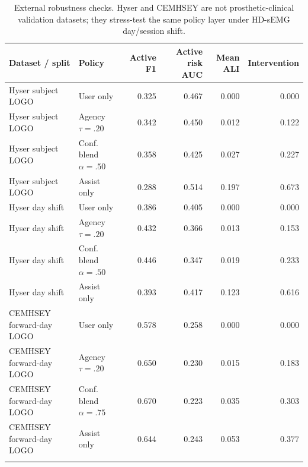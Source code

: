 \begin{table}[!t]
\centering
\caption{External robustness checks. Hyser and CEMHSEY are not prosthetic-clinical validation datasets; they stress-test the same policy layer under HD-sEMG day/session shift.}
\label{tab:external}
\footnotesize
\begin{tabular}{llrrrr}
\toprule
Dataset / split & Policy & Active F1 & Active risk AUC & Mean ALI & Intervention \\
\midrule
Hyser subject LOGO & User only & 0.325 & 0.467 & 0.000 & 0.000 \\
Hyser subject LOGO & Agency $\tau=.20$ & 0.342 & 0.450 & 0.012 & 0.122 \\
Hyser subject LOGO & Conf. blend $\alpha=.50$ & 0.358 & 0.425 & 0.027 & 0.227 \\
Hyser subject LOGO & Assist only & 0.288 & 0.514 & 0.197 & 0.673 \\
\addlinespace
Hyser day shift & User only & 0.386 & 0.405 & 0.000 & 0.000 \\
Hyser day shift & Agency $\tau=.20$ & 0.432 & 0.366 & 0.013 & 0.153 \\
Hyser day shift & Conf. blend $\alpha=.50$ & 0.446 & 0.347 & 0.019 & 0.233 \\
Hyser day shift & Assist only & 0.393 & 0.417 & 0.123 & 0.616 \\
\addlinespace
CEMHSEY forward-day LOGO & User only & 0.578 & 0.258 & 0.000 & 0.000 \\
CEMHSEY forward-day LOGO & Agency $\tau=.20$ & 0.650 & 0.230 & 0.015 & 0.183 \\
CEMHSEY forward-day LOGO & Conf. blend $\alpha=.75$ & 0.670 & 0.223 & 0.035 & 0.303 \\
CEMHSEY forward-day LOGO & Assist only & 0.644 & 0.243 & 0.053 & 0.377 \\
\addlinespace
\bottomrule
\end{tabular}
\end{table}

